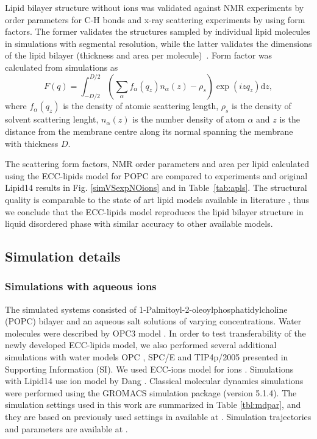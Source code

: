 \documentclass[aip,jcp,twocolumn]{revtex4}
\begin{document}
Lipid bilayer structure without ions was validated against NMR experiments
by order parameters for C-H bonds and x-ray scattering experiments by using
form factors. The former validates the structures sampled by individual
lipid molecules in simulations with segmental resolution, while the latter
validates the dimensions of the lipid bilayer (thickness and area per
molecule)~\cite{ollila16}. Form factor was calculated from simulations
as 
\begin{equation}
  F(q) = \int _{-D/2} ^{D/2} \left ( \sum _\alpha f_\alpha (q_z) n_\alpha (z) - \rho _s \right ) \exp (izq_z) \mathrm{d}z,
\end{equation}
where $f_\alpha(q_z)$ is the density of atomic scattering length, 
$\rho_s$ is the density of solvent scattering lenght,
$n_\alpha (z)$ is the number density of atom $\alpha$ and
$z$ is the distance from the membrane centre along its normal 
spanning the membrane with thickness $D$. 

The scattering form factors, NMR order parameters and area per lipid calculated  
using the ECC-lipids model for POPC are compared to experiments and original
Lipid14 results in Fig. \ref{simVSexpNOions} and in Table~\ref{tab:apls}. 
The structural quality is comparable to the state of art lipid models available in literature \cite{ollila16},
thus we conclude that the ECC-lipids model reproduces the lipid bilayer structure
in liquid disordered phase with similar accuracy to other available models. 



\subsection{Simulation details}

\subsubsection{Simulations with aqueous ions}
The simulated systems consisted of 1-Palmitoyl-2-oleoylphosphatidylcholine
(POPC) bilayer and an aqueous salt solutions of varying concentrations.
Water molecules were described by OPC3 model \cite{Izadi16}.
In order to test transferability of the newly developed ECC-lipids model, 
we also performed several additional simulations with water models 
OPC \cite{Izadi14}, SPC/E \cite{Berendsen1987} and TIP4p/2005 \cite{Abascal2005}
presented in Supporting Information (SI). 
We used ECC-ions model for ions \cite{jungwirth17-new-paper-to-be-published, kohagen16, Pluharova2014}.  %
Simulations with Lipid14 use ion model by Dang \cite{smith94,chang1999,dang2006}. 
Classical molecular dynamics simulations were performed using the GROMACS \cite{Abraham15} simulation package (version 5.1.4).  
The simulation settings used in this work are 
summarized in Table \ref{tbl:mdpar}, 
and they are based on previously used settings in \cite{catte16} available at \cite{lipid14POPC0mMNaClfiles}. 
Simulation trajectories and parameters are available at \cite{??} .
\end{document}
